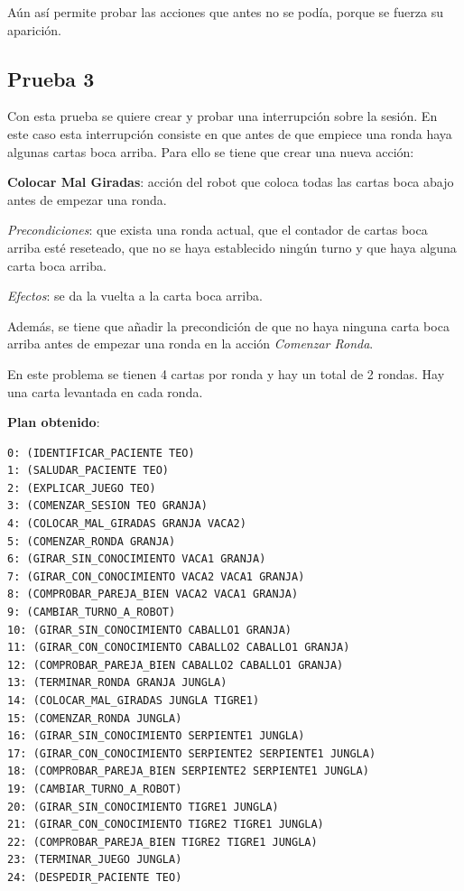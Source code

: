 \documentclass{uc3mpracticas}
\begin{document}
  \vspace{2mm}

  Aún así permite probar las acciones que antes no se podía, porque se fuerza su aparición.


  \subsection{Prueba 3}

  Con esta prueba se quiere crear y probar una interrupción sobre la sesión. En este caso esta interrupción consiste en que antes de que empiece una ronda haya algunas cartas boca arriba. Para ello se tiene que crear una nueva acción:

  \vspace{2mm}

  \textbf{Colocar Mal Giradas}: acción del robot que coloca todas las cartas boca abajo antes de empezar una ronda.

  \vspace{1mm}

    \textit{Precondiciones}: que exista una ronda actual, que el contador de cartas boca arriba esté reseteado, que no se haya establecido ningún turno y que haya alguna carta boca arriba.

    \vspace{1mm}

    \textit{Efectos}: se da la vuelta a la carta boca arriba.


  \vspace{2mm}

  Además, se tiene que añadir la precondición de que no haya ninguna carta boca arriba antes de empezar una ronda en la acción \textit{Comenzar Ronda}.

  \vspace{3mm}

  En este problema se tienen 4 cartas por ronda y hay un total de 2 rondas. Hay una carta levantada en cada ronda.

  \vspace{3mm}

    \textbf{Plan obtenido}:

    \begin{lstlisting}
0: (IDENTIFICAR_PACIENTE TEO)
1: (SALUDAR_PACIENTE TEO)
2: (EXPLICAR_JUEGO TEO)
3: (COMENZAR_SESION TEO GRANJA)
4: (COLOCAR_MAL_GIRADAS GRANJA VACA2)
5: (COMENZAR_RONDA GRANJA)
6: (GIRAR_SIN_CONOCIMIENTO VACA1 GRANJA)
7: (GIRAR_CON_CONOCIMIENTO VACA2 VACA1 GRANJA)
8: (COMPROBAR_PAREJA_BIEN VACA2 VACA1 GRANJA)
9: (CAMBIAR_TURNO_A_ROBOT)
10: (GIRAR_SIN_CONOCIMIENTO CABALLO1 GRANJA)
11: (GIRAR_CON_CONOCIMIENTO CABALLO2 CABALLO1 GRANJA)
12: (COMPROBAR_PAREJA_BIEN CABALLO2 CABALLO1 GRANJA)
13: (TERMINAR_RONDA GRANJA JUNGLA)
14: (COLOCAR_MAL_GIRADAS JUNGLA TIGRE1)
15: (COMENZAR_RONDA JUNGLA)
16: (GIRAR_SIN_CONOCIMIENTO SERPIENTE1 JUNGLA)
17: (GIRAR_CON_CONOCIMIENTO SERPIENTE2 SERPIENTE1 JUNGLA)
18: (COMPROBAR_PAREJA_BIEN SERPIENTE2 SERPIENTE1 JUNGLA)
19: (CAMBIAR_TURNO_A_ROBOT)
20: (GIRAR_SIN_CONOCIMIENTO TIGRE1 JUNGLA)
21: (GIRAR_CON_CONOCIMIENTO TIGRE2 TIGRE1 JUNGLA)
22: (COMPROBAR_PAREJA_BIEN TIGRE2 TIGRE1 JUNGLA)
23: (TERMINAR_JUEGO JUNGLA)
24: (DESPEDIR_PACIENTE TEO)
    \end{lstlisting}
\end{document}
